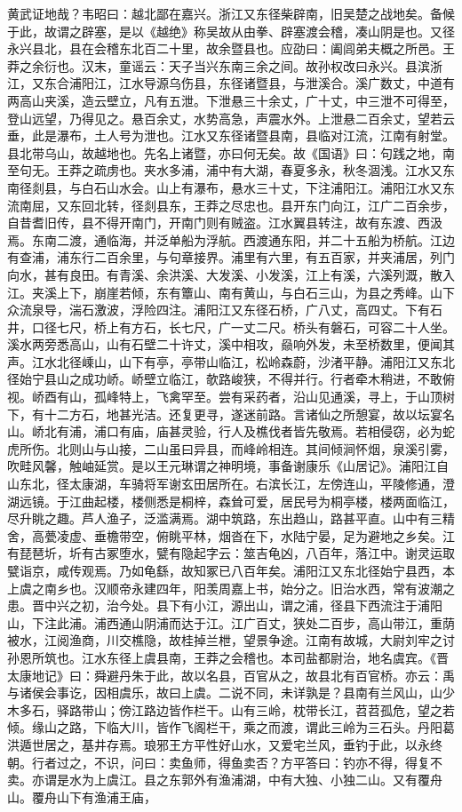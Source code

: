 \documentclass[12pt,UTF8]{ctexbook}
\begin{document}
黄武证地哉？韦昭曰：越北鄙在嘉兴。浙江又东径柴辟南，旧吴楚之战地矣。备候于此，故谓之辟塞，是以《越绝》称吴故从由拳、辟塞渡会稽，凑山阴是也。又径永兴县北，县在会稽东北百二十里，故余暨县也。应劭曰：阖闾弟夫概之所邑。王莽之余衍也。汉末，童谣云：天子当兴东南三余之间。故孙权改曰永兴。县滨浙江，又东合浦阳江，江水导源乌伤县，东径诸暨县，与泄溪合。溪广数丈，中道有两高山夹溪，造云壁立，凡有五泄。下泄悬三十余丈，广十丈，中三泄不可得至，登山远望，乃得见之。悬百余丈，水势高急，声震水外。上泄悬二百余丈，望若云垂，此是瀑布，土人号为泄也。江水又东径诸暨县南，县临对江流，江南有射堂。县北带乌山，故越地也。先名上诸暨，亦曰何无矣。故《国语》曰：句践之地，南至句无。王莽之疏虏也。夹水多浦，浦中有大湖，春夏多永，秋冬涸浅。江水又东南径剡县，与白石山水会。山上有瀑布，悬水三十丈，下注浦阳江。浦阳江水又东流南屈，又东回北转，径剡县东，王莽之尽忠也。县开东门向江，江广二百余步，自昔耆旧传，县不得开南门，开南门则有贼盗。江水翼县转注，故有东渡、西汲焉。东南二渡，通临海，并泛单船为浮航。西渡通东阳，并二十五船为桥航。江边有查浦，浦东行二百余里，与句章接界。浦里有六里，有五百家，并夹浦居，列门向水，甚有良田。有青溪、余洪溪、大发溪、小发溪，江上有溪，六溪列溉，散入江。夹溪上下，崩崖若倾，东有簟山、南有黄山，与白石三山，为县之秀峰。山下众流泉导，湍石激波，浮险四注。浦阳江又东径石桥，广八丈，高四丈。下有石井，口径七尺，桥上有方石，长七尺，广一丈二尺。桥头有磐石，可容二十人坐。溪水两旁悉高山，山有石壁二十许丈，溪中相攻，赑响外发，未至桥数里，便闻其声。江水北径嵊山，山下有亭，亭带山临江，松岭森蔚，沙渚平静。浦阳江又东北径始宁县山之成功峤。峤壁立临江，欹路峻狭，不得并行。行者牵木稍进，不敢俯视。峤酉有山，孤峰特上，飞禽罕至。尝有采药者，沿山见通溪，寻上，于山顶树下，有十二方石，地甚光洁。还复更寻，遂迷前路。言诸仙之所憩宴，故以坛宴名山。峤北有浦，浦口有庙，庙甚灵验，行人及樵伐者皆先敬焉。若相侵窃，必为蛇虎所伤。北则山与山接，二山虽曰异县，而峰岭相连。其间倾涧怀烟，泉溪引雾，吹畦风馨，触岫延赏。是以王元琳谓之神明境，事备谢康乐《山居记》。浦阳江自山东北，径太康湖，车骑将军谢玄田居所在。右滨长江，左傍连山，平陵修通，澄湖远镜。于江曲起楼，楼侧悉是桐梓，森耸可爱，居民号为桐亭楼，楼两面临江，尽升眺之趣。芦人渔子，泛滥满焉。湖中筑路，东出趋山，路甚平直。山中有三精舍，高甍凌虚、垂檐带空，俯眺平林，烟沓在下，水陆宁晏，足为避地之乡矣。江有琵琶圻，圻有古冢堕水，甓有隐起字云：筮吉龟凶，八百年，落江中。谢灵运取甓诣京，咸传观焉。乃如龟繇，故知冢已八百年矣。浦阳江又东北径始宁县西，本上虞之南乡也。汉顺帝永建四年，阳羡周嘉上书，始分之。旧治水西，常有波潮之患。晋中兴之初，治今处。县下有小江，源出山，谓之浦，径县下西流注于浦阳山，下注此浦。浦西通山阴浦而达于江。江广百丈，狭处二百步，高山带江，重荫被水，江阅渔商，川交樵隐，故桂掉兰枻，望景争途。江南有故城，大尉刘牢之讨孙恩所筑也。江水东径上虞县南，王莽之会稽也。本司盐都尉治，地名虞宾。《晋太康地记》曰：舜避丹朱于此，故以名县，百官从之，故县北有百官桥。亦云：禹与诸侯会事讫，因相虞乐，故曰上虞。二说不同，未详孰是？县南有兰风山，山少木多石，驿路带山；傍江路边皆作栏干。山有三岭，枕带长江，苕苕孤危，望之若倾。缘山之路，下临大川，皆作飞阁栏干，乘之而渡，谓此三岭为三石头。丹阳葛洪遁世居之，基井存焉。琅邪王方平性好山水，又爱宅兰风，垂钓于此，以永终朝。行者过之，不识，问曰：卖鱼师，得鱼卖否？方平答曰：钓亦不得，得复不卖。亦谓是水为上虞江。县之东郭外有渔浦湖，中有大独、小独二山。又有覆舟山。覆舟山下有渔浦王庙，
\end{document}
